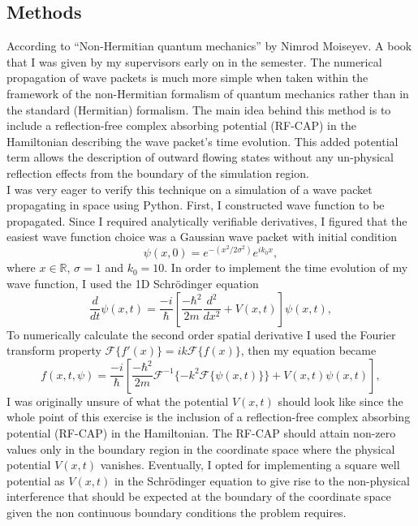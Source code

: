 \documentclass[10pt, a4paper, singlespacing, headsepline]{article}
\begin{document}
\subsection{Methods}
According to ``Non-Hermitian quantum mechanics'' by Nimrod Moiseyev. A book that I was given by my supervisors early on in the semester. The numerical propagation of wave packets is much more simple when taken within the framework of the non-Hermitian formalism of quantum mechanics rather than in the standard (Hermitian) formalism\cite{Moiseyev}. The main idea behind this method is to include a reflection-free complex absorbing potential (RF-CAP) in the Hamiltonian describing the wave packet's time evolution. This added potential term allows the description of outward flowing states without any un-physical reflection effects from the boundary of the simulation region.\\
I was very eager to verify this technique on a simulation of a wave packet propagating in space using Python. First, I constructed wave function to be propagated. Since I required analytically verifiable derivatives, I figured that the easiest wave function choice was a Gaussian wave packet with initial condition 
\begin{equation}
\psi(x, 0) = e^{-(x^2/2\sigma^2)}e^{ik_{0}x},
\end{equation}
where $x \in \mathds{R}$, $\sigma = 1$ and $k_{0} = 10$. In order to implement the time evolution of my wave function, I used the 1D Schrödinger equation
 \begin{equation}
\frac{d}{dt}\psi(x, t) = \frac{-i}{\hbar} \left [ \frac{-\hbar^2}{2m} \frac{d^2}{dx^2} + V(x, t)\right ] \psi(x, t),
\end{equation}
To numerically calculate the second order spatial derivative I used the Fourier transform property \mbox{$\mathcal{F}\{f'(x)\} = ik\mathcal{F}\{f(x)\}$}, then my equation became
\begin{equation} \label{eq:15}
f(x, t, \psi) =  \frac{-i}{\hbar} \left [ \frac{-\hbar^2}{2m} \mathcal{F}^{-1}\{-k^2\mathcal{F}\{\psi(x, t)\}\} + V(x, t)\psi(x, t)\right ],
\end{equation}
I was originally unsure of what the potential $V(x,t)$ should look like since the whole point of this exercise is the inclusion of a reflection-free complex absorbing potential (RF-CAP) in the Hamiltonian. The RF-CAP should attain non-zero values only in the boundary region in the coordinate space where the physical potential $V(x,t)$ vanishes\cite{Moiseyev}. Eventually, I opted for implementing a square well potential as $V(x,t)$ in the Schrödinger equation to give rise to the non-physical interference that should be expected at the boundary of the coordinate space given the non continuous boundary conditions the problem requires.
\end{document}
